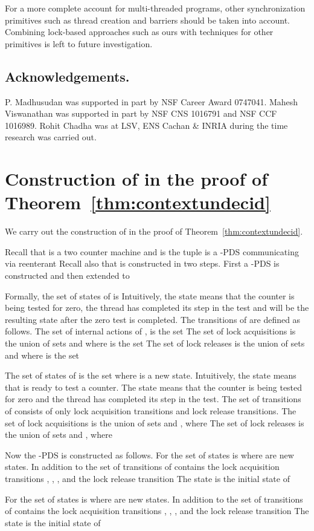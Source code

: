 \documentclass{LMCS}
\begin{document}
For a more complete account for multi-threaded programs, other synchronization
primitives such as thread creation and barriers should be taken into account. Combining
lock-based approaches such as ours with techniques for other primitives is left to
future investigation.






\subsection{Acknowledgements.}
P. Madhusudan was supported in part by NSF Career Award 0747041. Mahesh Viswanathan was 
supported in part by NSF CNS 1016791 and NSF CCF 1016989. Rohit Chadha was at LSV, ENS Cachan \& INRIA
during the time research was carried out.





\appendix
\section{Construction of  in the proof of Theorem~\ref{thm:contextundecid}}


We carry out the construction of   in the proof of Theorem~\ref{thm:contextundecid}. 

Recall that   is  a two  counter machine and  is the tuple    is a -PDS communicating via reenterant 
 Recall also that  is constructed in two steps. First a -PDS 
 is constructed and then extended to   

Formally,  the set of states of  is   Intuitively, the state
 means that the counter  is being tested for zero, the thread  has completed its  step in the test    and  will be the resulting state after the zero test is completed.   
The transitions 
of   
are defined as follows. The set of internal actions of ,  is the set  
The set of lock acquisitions  is the union of sets  and  where
 is the set
 The set of lock releases  is the union of sets  and  where
 is the set
 

   
The set of states of  is the set 
where  is a new state. Intuitively, the state  means that  is ready to test a counter.
The state  means that the counter  is being tested for zero and the thread  has completed its  step in the test.  The set of transitions 
of   consists of only lock acquisition transitions and lock release transitions.     The set of lock acquisitions  is the union of sets  and , where
 The set of lock releases  is the union of sets  and , where
 

Now the -PDS  is constructed as follows. For   the set of states is  where  are new states. In addition to  the set of
transitions of 
 contains the  lock acquisition transitions 
, , ,  and the lock release transition  The state  is the initial state of 

For  the set of states is  where  are new states. In addition to  the set of
transitions of 
contains the  lock acquisition transitions , , ,   and the lock release transition  The state  is the initial state of 
\end{document}
